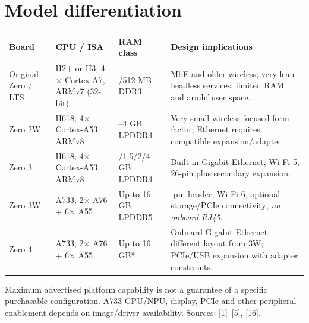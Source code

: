 \documentclass[10pt,oneside,openany]{report}
\begin{document}
\section{Model differentiation}
\begin{center}
\small\begin{tabularx}{\textwidth}{@{}>{\raggedright\arraybackslash}p{2.45cm}>{\raggedright\arraybackslash}p{2.45cm}>{\raggedright\arraybackslash}p{2.0cm}>{\raggedright\arraybackslash}X@{}}\toprule
\textbf{Board} & \textbf{CPU / ISA} & \textbf{RAM class} & \textbf{Design implications}\\\midrule
Original Zero / LTS & H2+ or H3; 4\(\times\) Cortex-A7, ARMv7 (32-bit) & 256/512 MB DDR3 & 100 MbE and older wireless; very lean headless services; limited RAM and armhf user space.\\
Zero 2W & H618; 4\(\times\) Cortex-A53, ARMv8 & 1--4 GB LPDDR4 & Very small wireless-focused form factor; Ethernet requires compatible expansion/adapter.\\
Zero 3 & H618; 4\(\times\) Cortex-A53, ARMv8 & 1/1.5/2/4 GB LPDDR4 & Built-in Gigabit Ethernet, Wi-Fi 5, 26-pin plus secondary expansion.\\
Zero 3W & A733; 2\(\times\) A76 + 6\(\times\) A55 & Up to 16 GB LPDDR5 & 40-pin header, Wi-Fi 6, optional storage/PCIe connectivity; \emph{no onboard RJ45}.\\
Zero 4 & A733; 2\(\times\) A76 + 6\(\times\) A55 & Up to 16 GB* & Onboard Gigabit Ethernet; different layout from 3W; PCIe/USB expansion with adapter constraints.\\\bottomrule
\end{tabularx}
\end{center}
{\footnotesize *Maximum advertised platform capability is not a guarantee of a specific purchasable configuration. A733 GPU/NPU, display, PCIe and other peripheral enablement depends on image/driver availability. Sources: [1]--[5], [16].}\par
\end{document}
